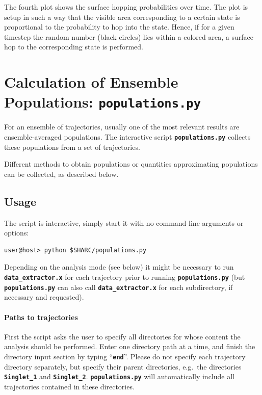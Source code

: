 \documentclass[a4paper,11pt,DIV=15,openany,twoside=false]{scrbook}
\newcommand{\ttt}[1]{\textbf{\texttt{#1}}}
\begin{document}
The fourth plot shows the surface hopping probabilities over time. The plot is setup in such a way that the visible area corresponding to a certain state is proportional to the probability to hop into the state. Hence, if for a given timestep the random number (black circles) lies within a colored area, a surface hop to the corresponding state is performed.





\section{Calculation of Ensemble Populations: \ttt{populations.py}}\label{sec:populations.py}

For an ensemble of trajectories, usually one of the most relevant results are ensemble-averaged populations. The interactive script \ttt{populations.py} collects these populations from a set of trajectories. 

Different methods to obtain populations or quantities approximating populations can be collected, as described below.

\subsection{Usage}

The script is interactive, simply start it with no command-line arguments or options:
\begin{verbatim}
user@host> python $SHARC/populations.py
\end{verbatim}

Depending on the analysis mode (see below) it might be necessary to run \ttt{data\_extractor.x} for each trajectory prior to running \ttt{populations.py} (but \ttt{populations.py} can also call \ttt{data\_extractor.x} for each subdirectory, if necessary and requested). 

\paragraph{Paths to trajectories}

First the script asks the user to specify all directories for whose content the analysis should be performed. Enter one directory path at a time, and finish the directory input section by typing ``\ttt{end}''. Please do not specify each trajectory directory separately, but specify their parent directories, e.g.\ the directories \ttt{Singlet\_1} and \ttt{Singlet\_2}. \ttt{populations.py} will automatically include all trajectories contained in these directories.
\end{document}
